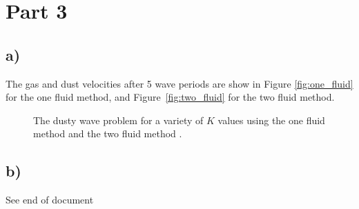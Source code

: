 \documentclass{article}
\begin{document}
\section*{Part 3}
\subsection*{a)}
The gas and dust velocities after 5 wave periods are show in Figure
\ref{fig:one_fluid} for the one fluid method, and Figure~\ref{fig:two_fluid} for
the two fluid method.
\begin{figure}%
    \centering
    \qquad
    \caption[]{The dusty wave problem for a variety of $K$ values using
    the one fluid method  and the
    two fluid method .}
    \end{figure}
    
\subsection*{b)}
See end of document
\end{document}
